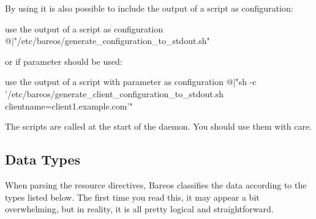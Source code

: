 By using  it is also possible to include the output of a script as configuration:
\begin{bconfig}{use the output of a script as configuration}
@|"/etc/bareos/generate_configuration_to_stdout.sh"
\end{bconfig}
or if parameter should be used:
\begin{bconfig}{use the output of a script with parameter as configuration}
@|"sh -c '/etc/bareos/generate_client_configuration_to_stdout.sh clientname=client1.example.com'"
\end{bconfig}
The scripts are called at the start of the daemon. You should use them with care.


\subsection{Data Types}
\label{DataTypes}

When parsing the resource directives, Bareos classifies the data according to
the types listed below. The first time you read this, it may appear a bit
overwhelming, but in reality, it is all pretty logical and straightforward.

